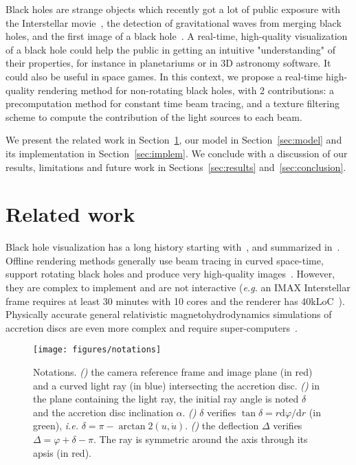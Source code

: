 \documentclass{document}
\newcommand{\diff}{\mathrm d}
\begin{document}
Black holes are strange objects which recently got a lot of  public exposure 
with the Interstellar movie~\cite{James2015}, the detection of gravitational 
waves from merging black holes\cite{GRWave2016}, and the first image of a black 
hole~\cite{EHT2019}. A real-time, high-quality visualization of a black hole 
could help the public in getting an intuitive "understanding" of their 
properties, for instance in planetariums or in 3D astronomy software. It could 
also be useful in space games. In this context, we propose a real-time 
high-quality rendering method for non-rotating black holes, with 2 
contributions: a precomputation method for constant time beam tracing, and a 
texture filtering scheme to compute the contribution of the light sources to 
each beam.

We present the related work in Section~\ref{sec:relatedwork}, our model in 
Section~\ref{sec:model} and its implementation in Section~\ref{sec:implem}. We 
conclude with a discussion of our results, limitations and future work in 
Sections~\ref{sec:results} and~\ref{sec:conclusion}.

\section{Related work}\label{sec:relatedwork}

Black hole visualization has a long history starting with~\cite{Luminet1979}, 
and summarized in~\cite{Luminet2019}. Offline rendering methods generally use  
beam tracing in curved space-time, support rotating black holes and produce 
very high-quality images~\cite{Hamilton2014,Riazuelo2014,James2015}. However, 
they are complex to implement and are not interactive ({\em e.g.} an IMAX 
Interstellar frame requires at least 30 minutes with 10 cores and the renderer 
has 40kLoC~\cite{James2015}). Physically accurate general relativistic 
magnetohydrodynamics simulations of accretion discs are even more complex and 
require super-computers~\cite{MNRAS2018}.

\begin{figure*}[htb]
	\centering
	\texttt{[image: figures/notations]}
	{\label{fig:notations:a}}
	{\label{fig:notations:b}}
	{\label{fig:notations:c}}
	{\label{fig:notations:d}}
	\caption{Notations. {\em ()} the camera reference 
	frame and image plane (in red) and a curved light ray (in blue) intersecting 
	the accretion disc. {\em ()} in the plane containing 
	the light ray, the initial ray angle is noted $\delta$ and the accretion disc 
	inclination $\alpha$. {\em ()} $\delta$ verifies 
	$\tan\delta = r \diff\varphi / \diff r$ (in green), {\em i.e.} 
	$\delta = \pi - \arctan2(u, \dot{u})$. {\em ()} the 
	deflection $\Delta$ verifies $\Delta = \varphi + \delta - \pi$. The ray is 
	symmetric around the axis through its apsis (in red).}
\end{figure*}
\end{document}
